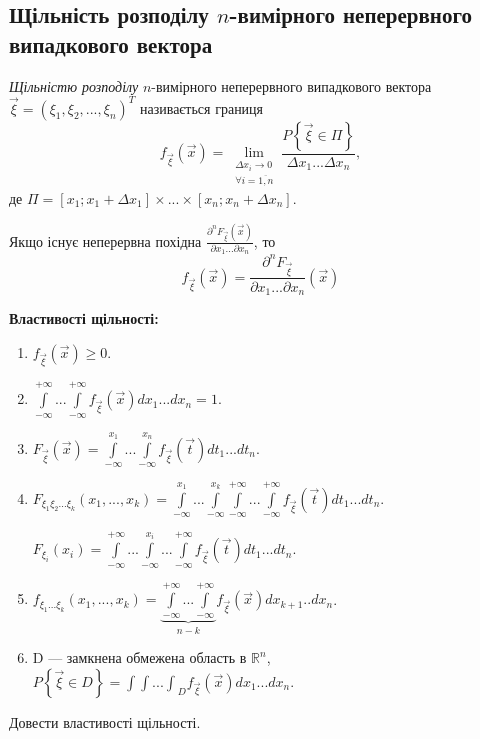 \subsection{Щільність розподілу \texorpdfstring{$n$}{n}-вимірного неперервного випадкового 
вектора}
\begin{definition}
    \emph{Щільністю розподілу} $n$-вимірного неперервного випадкового 
    вектора $\vec{\xi} = \left(\xi_1, \xi_2, ..., \xi_n\right)^T$ називається границя
    \begin{equation}
        f_{\vec{\xi}} (\vec{x}) = \lim_{\substack{\Delta x_i \to 0 \\
        \forall i = \overline{1,n}}} 
        \frac{P\left\{\vec{\xi} \in \Pi\right\}}{\Delta x_1...\Delta x_n},
    \end{equation}
    де $\Pi = 
    \left[x_1; x_1+\Delta x_1\right] \times ... \times 
    \left[x_n; x_n+\Delta x_n\right]$.

    Якщо існує неперервна похідна $\frac{\partial^n F_{\vec{\xi}}(\vec{x})}
    {\partial x_1 ... \partial x_n}$, то
    \begin{equation}
        f_{\vec{\xi}} (\vec{x}) = \frac{\partial^n F_{\vec{\xi}}}
        {\partial x_1 ... \partial x_n}(\vec{x})
    \end{equation}
\end{definition}

\noindent \textbf{Властивості щільності:}
\begin{enumerate}
    \item $f_{\vec{\xi}}(\vec{x}) \geq 0$.
    \item $\int\limits_{-\infty}^{+\infty}...\int\limits_{-\infty}^{+\infty}
    f_{\vec{\xi}} (\vec{x})dx_1...dx_n = 1$.
    \item $F_{\vec{\xi}}(\vec{x}) = 
    \int\limits_{-\infty}^{x_1}...\int\limits_{-\infty}^{x_n}
    f_{\vec{\xi}} (\vec{t})dt_1...dt_n$.
    \item $F_{\xi_1\xi_2...\xi_k}(x_1, ..., x_k) = 
    \int\limits_{-\infty}^{x_1}...\int\limits_{-\infty}^{x_k}
    \int\limits_{-\infty}^{+\infty}...\int\limits_{-\infty}^{+\infty}
    f_{\vec{\xi}} (\vec{t})dt_1...dt_n$.

    $F_{\xi_i}(x_i) = \int\limits_{-\infty}^{+\infty}...
    \int\limits_{-\infty}^{x_i}...\int\limits_{-\infty}^{+\infty}
    f_{\vec{\xi}} (\vec{t})dt_1...dt_n$.

    \item $f_{\xi_1...\xi_k}(x_1, ..., x_k) = 
    \underbrace{
        \int\limits_{-\infty}^{+\infty} 
        ... 
        \int\limits_{-\infty}^{+\infty}
    }_{n-k} f_{\vec{\xi}}(\vec{x}) dx_{k+1}..dx_n$.
    \item D --- замкнена обмежена область в $\mathbb{R}^n$,
    $P\left\{\vec{\xi} \in D\right\} = {\int\int...\int}_D f_{\vec{\xi}}(\vec{x})
    dx_1 ... dx_n$.
\end{enumerate}
\begin{exercise}
    Довести властивості щільності.
\end{exercise}


